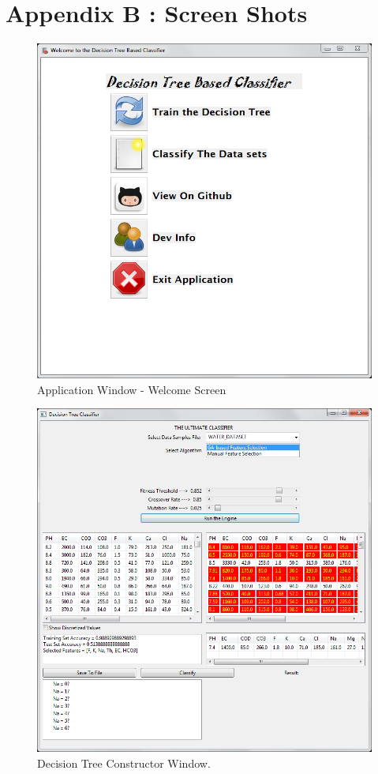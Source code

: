 \documentclass[12pt]{report}
\begin{document}
\section*{Appendix B : Screen Shots}
\begin{figure}[h!]

  \centering
    \includegraphics[scale=0.40]{welcome_window.png}
  \caption{Application Window - Welcome Screen}
\end{figure}

\begin{figure}[h!]
  
  \centering
    \includegraphics[scale=0.45]{dt_classifier.png}
\caption{Decision Tree Constructor Window.}
\end{figure}
\end{document}
